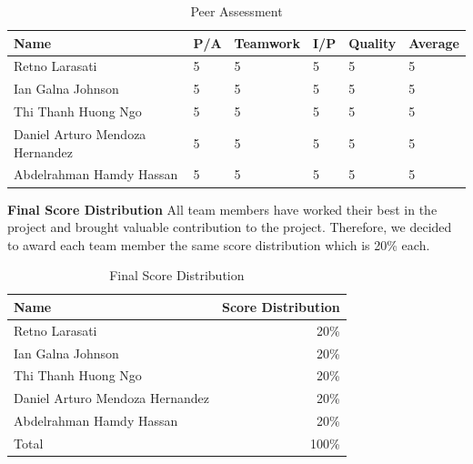 \documentclass[11pt]{article}
\begin{document}
\begin{enumerate}
\begin{table}[H]
    \centering
    \begin{tabular}{p{4cm}|p{1.8cm}|p{1.8cm}|p{1.8cm}|p{1.8cm}|p{1.8cm}}
         \textbf{Name} & \textbf{P/A} &  \textbf{Teamwork} & \textbf{I/P} & \textbf{Quality} &\textbf{Average}  \\ \hline
         Retno Larasati & 5 & 5 & 5 & 5   & 5           \\ \hline
         Ian Galna Johnson &5 & 5 & 5 & 5 & 5           \\ \hline
         Thi Thanh Huong Ngo & 5 & 5 & 5 & 5 & 5       \\ \hline   
         Daniel Arturo Mendoza Hernandez & 5 & 5 & 5 & 5 & 5  \\ \hline
         Abdelrahman Hamdy Hassan  & 5 & 5 & 5 & 5  & 5 \\ \hline
    \end{tabular}
    \caption{Peer Assessment}
    \label{tab:assessment}
\end{table}

\textbf{Final Score Distribution} \newline
All team members have worked their best in the project and brought valuable contribution to the project. Therefore, we decided to award each team member the same score distribution which is 20\% each. 

\begin{table}[H]
    \centering
    \begin{tabular}{l|r}
         \textbf{Name} & \textbf{Score Distribution}  \\ \hline
         Retno Larasati & 20\%           \\ \hline
         Ian Galna Johnson & 20\%           \\ \hline
         Thi Thanh Huong Ngo & 20\%        \\ \hline   
         Daniel Arturo Mendoza Hernandez & 20\%  \\ \hline
         Abdelrahman Hamdy Hassan  & 20\%  \\ \hline
         Total & 100\% \\
    \end{tabular}
    \caption{Final Score Distribution}
    \label{tab:finalscore}
\end{table}

	
\newpage






\newpage


\end{enumerate}
\end{document}
